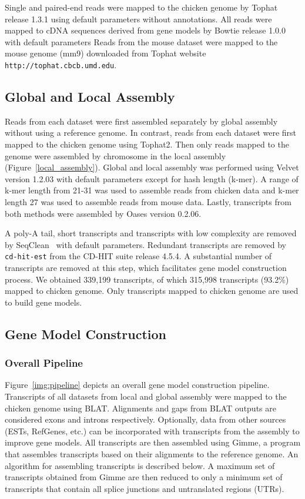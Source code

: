 \documentclass[10pt]{article}
\begin{document}
Single and paired-end reads were mapped to the chicken genome by
Tophat\cite{Trapnell:2009dp} release 1.3.1 using default parameters without
annotations.  All reads were mapped to cDNA sequences derived from gene models
by Bowtie\cite{Langmead:2009fv} release 1.0.0 with default parameters Reads from the
mouse dataset were mapped to the mouse genome (mm9) downloaded from Tophat
website \texttt{http://tophat.cbcb.umd.edu}.

\subsection*{Global and Local Assembly}

Reads from each dataset were first assembled separately by global assembly
without using a reference genome.  In contrast, reads from each dataset were
first mapped to the chicken genome using Tophat2.  Then only reads mapped to
the genome were assembled by chromosome in the local assembly
(Figure~\ref{local_assembly}).  Global and local assembly was performed using
Velvet version 1.2.03\cite{Zerbino:2008vu} with default parameters except for
hash length (k-mer).  A range of k-mer length from 21-31 was used to assemble
reads from chicken data and k-mer length 27 was used to assemble reads from
mouse data.  Lastly, transcripts from both methods were assembled by Oases
version 0.2.06\cite{Schulz:2012je}.

A poly-A tail, short transcripts and transcripts with low complexity are
removed by SeqClean~\cite{seqclean} with default parameters.  Redundant
transcripts are removed by \texttt{cd-hit-est} from the CD-HIT
suite\cite{Li:2006hr} release 4.5.4.  A substantial number of transcripts are
removed at this step, which facilitates gene model construction process.  We
obtained 339,199 transcripts, of which 315,998 transcripts (93.2\%) mapped to
chicken genome.  Only transcripts mapped to chicken genome are used to build
gene models.

\subsection*{Gene Model Construction}

\subsubsection*{Overall Pipeline}

Figure~\ref{img:pipeline} depicts an overall gene model construction
pipeline.  Transcripts of all datasets from local and global assembly were
mapped to the chicken genome using BLAT\cite{Kent:2002tv}. Alignments and gaps
from BLAT outputs are considered exons and introns respectively.  Optionally,
data from other sources (ESTs, RefGenes, etc.) can be incorporated with
transcripts from the assembly to improve gene models.  All transcripts are then
assembled using Gimme, a program that assembles transcripts based on their
alignments to the reference genome.  An algorithm for assembling transcripts is
described below.  A maximum set of transcripts obtained from Gimme are then
reduced to only a minimum set of transcripts that contain all splice junctions
and untranslated regions (UTRs).
\end{document}
